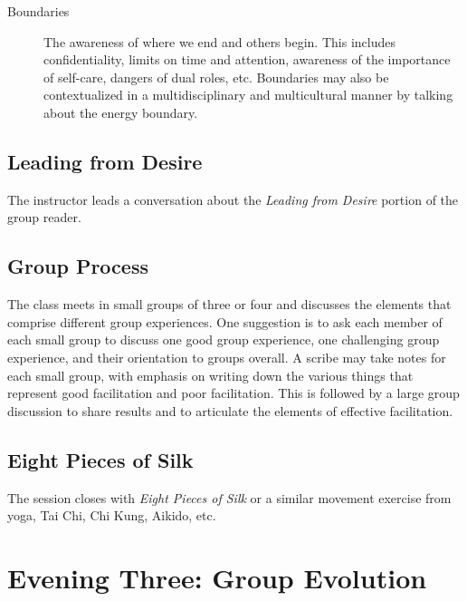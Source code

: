 \documentclass[12pt,DIV7,oneside,tocindent,headsepline]{scrbook}
\begin{document}
\begin{description} 
\item[Boundaries]  
The awareness of where we end and others begin. This includes confidentiality, limits on time and attention, awareness of the importance of self-care, dangers of dual roles, etc. Boundaries may also be contextualized in a multidisciplinary and multicultural manner by talking about the energy boundary. \end{description} 

\subsection{Leading from Desire}  
The instructor leads a conversation about the \textit{Leading from Desire} portion of the group reader. 

\subsection{Group Process}  
The class meets in small groups of three or four and discusses the elements that comprise different group experiences. One suggestion is to ask each member of each small group to discuss one good group experience, one challenging group experience, and their orientation to groups overall. A scribe may take notes for each small group, with emphasis on writing down the various things that represent good facilitation and poor facilitation. This is followed by a large group discussion to share results and to articulate the elements of effective facilitation.  

\subsection{Eight Pieces of Silk}  The session closes with \textit{Eight Pieces of Silk} or a similar movement exercise from yoga, Tai Chi, Chi Kung, Aikido, etc.

\section{Evening Three: Group Evolution}  
\end{document}
